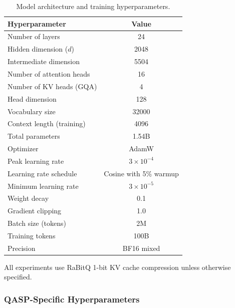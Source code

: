 \documentclass[twocolumn]{article}
\begin{document}
\begin{table}[htbp]
\centering
\caption{Model architecture and training hyperparameters.}
\label{tab:hyperparams}
\begin{tabular}{lc}
\toprule
\textbf{Hyperparameter} & \textbf{Value} \\
\midrule
Number of layers & 24 \\
Hidden dimension ($d$) & 2048 \\
Intermediate dimension & 5504 \\
Number of attention heads & 16 \\
Number of KV heads (GQA) & 4 \\
Head dimension & 128 \\
Vocabulary size & 32000 \\
Context length (training) & 4096 \\
Total parameters & 1.54B \\
\midrule
Optimizer & AdamW \\
Peak learning rate & $3 \times 10^{-4}$ \\
Learning rate schedule & Cosine with 5\% warmup \\
Minimum learning rate & $3 \times 10^{-5}$ \\
Weight decay & 0.1 \\
Gradient clipping & 1.0 \\
Batch size (tokens) & 2M \\
Training tokens & 100B \\
Precision & BF16 mixed \\
\bottomrule
\end{tabular}
\end{table}

All experiments use RaBitQ 1-bit KV cache compression unless otherwise specified.

\subsubsection{QASP-Specific Hyperparameters}
\end{document}
